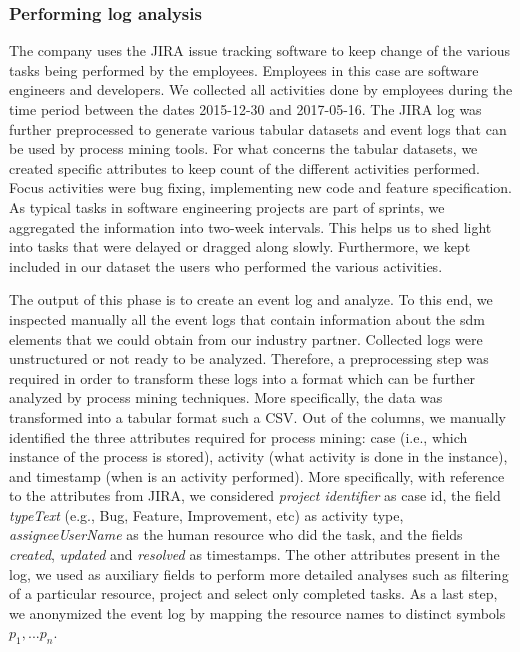\subsubsection{Performing log analysis}

The company uses the JIRA issue tracking software to keep change of the various tasks being performed by the employees. Employees in this case are software engineers and developers. We collected all activities done by employees during the time period between the dates 2015-12-30 and 2017-05-16.  The JIRA log was further preprocessed to generate various tabular datasets and event logs that can be used by process mining tools. For what concerns the tabular datasets, we created specific attributes to keep count of the different activities performed. Focus activities were bug fixing, implementing new code and feature specification. As typical tasks in software engineering projects are part of sprints, we aggregated the information into two-week intervals. This helps us to shed light into tasks that were delayed or dragged along slowly. Furthermore, we kept included in our dataset the users who performed the various activities.  

The output of this phase is to create an event log and analyze. To this end, we inspected manually all the event logs that contain information about the \gls{sdm} elements that we could obtain from our industry partner. Collected logs were unstructured or not ready to be analyzed. Therefore, a preprocessing step was required in order to transform these logs into a format which can be further analyzed by process mining techniques. More specifically, the data was transformed into a tabular format such a CSV. Out of the columns, we manually identified the three attributes required for process mining: case (i.e., which instance of the process is stored), activity (what activity is done in the instance), and timestamp (when is an activity performed). More specifically, with reference to the attributes from JIRA, we considered \emph{project identifier} as case id, the field \emph{typeText} (e.g., Bug, Feature, Improvement, etc) as activity type, \emph{assigneeUserName} as the human resource who did the task, and the fields \emph{created}, \emph{updated} and \emph{resolved} as timestamps. The other attributes present in the log, we used as auxiliary fields to perform more detailed analyses such as filtering of a particular resource, project and select only completed tasks. As a last step, we anonymized the event log by mapping the resource names to distinct symbols $p_1, ... p_n$.


